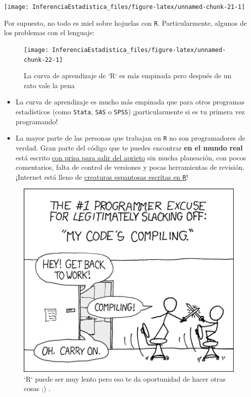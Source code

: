 \documentclass[
]{book}
\begin{document}
\begin{center}\texttt{[image: InferenciaEstadistica\_files/figure-latex/unnamed-chunk-21-1]} \end{center}

Por supuesto, no todo es miel sobre hojuelas con \texttt{R}. Particularmente, algunos de los problemas con el lenguaje:

\begin{figure}

{\centering \texttt{[image: InferenciaEstadistica\_files/figure-latex/unnamed-chunk-22-1]} 

}

\caption{La curva de aprendizaje de `R` es más empinada pero después de un rato vale la pena}\label{fig:unnamed-chunk-22}
\end{figure}

\begin{itemize}
\item
  La curva de aprendizaje es mucho más empinada que para otros programas estadísticos (como \texttt{Stata}, \texttt{SAS} o \texttt{SPSS}) ¡particularmente si es tu primera vez programando!
\item
  La mayor parte de las personas que trabajan en \texttt{R} no son programadores de verdad. Gran parte del código que te puedes encontrar \textbf{en el mundo real} está escrito \href{https://nsaunders.wordpress.com/2014/05/14/this-is-why-code-written-by-scientists-gets-ugly/}{con prisa para salir del aprieto} sin mucha planeación, con pocos comentarios, falta de control de versiones y pocas herramientas de revisión. ¡Internet está lleno de \href{https://codegolf.stackexchange.com/a/4011}{creaturas espantosas escritas en \texttt{R}}!
\end{itemize}

\begin{figure}

{\centering \includegraphics[width=5.74in]{images/compiling} 

}

\caption{`R` puede ser muy lento pero eso te da oportunidad de hacer otras cosas ;) .}\label{fig:unnamed-chunk-23}
\end{figure}
\end{document}
